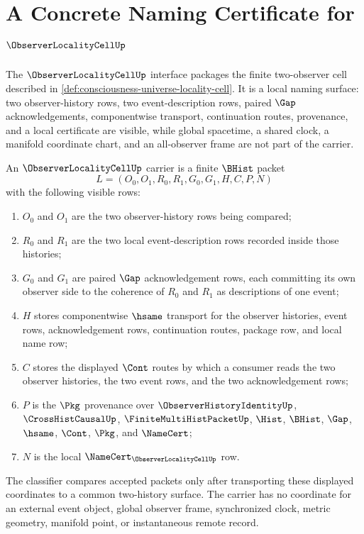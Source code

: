 \chapter{A Concrete Naming Certificate for $\ObserverLocalityCellUp$}
\label{ch:concrete-instances-observer-locality-cell-namecert}

The $\ObserverLocalityCellUp$ interface packages the finite two-observer cell described in \autoref{def:consciousness-universe-locality-cell}. It is a local naming surface: two observer-history rows, two event-description rows, paired $\Gap$ acknowledgements, componentwise transport, continuation routes, provenance, and a local certificate are visible, while global spacetime, a shared clock, a manifold coordinate chart, and an all-observer frame are not part of the carrier.

\begin{definition}
\label{def:observer-locality-cell-carrier}
An $\ObserverLocalityCellUp$ carrier is a finite $\BHist$ packet
$$
L=(O_0,O_1,R_0,R_1,G_0,G_1,H,C,P,N)
$$
with the following visible rows:
\begin{enumerate}
\item $O_0$ and $O_1$ are the two observer-history rows being compared;
\item $R_0$ and $R_1$ are the two local event-description rows recorded inside those histories;
\item $G_0$ and $G_1$ are paired $\Gap$ acknowledgement rows, each committing its own observer side to the coherence of $R_0$ and $R_1$ as descriptions of one event;
\item $H$ stores componentwise $\hsame$ transport for the observer histories, event rows, acknowledgement rows, continuation routes, package row, and local name row;
\item $C$ stores the displayed $\Cont$ routes by which a consumer reads the two observer histories, the two event rows, and the two acknowledgement rows;
\item $P$ is the $\Pkg$ provenance over $\ObserverHistoryIdentityUp$, $\CrossHistCausalUp$, $\FiniteMultiHistPacketUp$, $\Hist$, $\BHist$, $\Gap$, $\hsame$, $\Cont$, $\Pkg$, and $\NameCert$;
\item $N$ is the local $\NameCert_{\ObserverLocalityCellUp}$ row.
\end{enumerate}
The classifier compares accepted packets only after transporting these displayed coordinates to a common two-history surface. The carrier has no coordinate for an external event object, global observer frame, synchronized clock, metric geometry, manifold point, or instantaneous remote record.
\end{definition}

